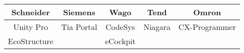 \begin{tabular}{c|c|c|c|c}
 \textbf{Schneider} & \textbf{Siemens} & \textbf{Wago} & \textbf{Tend} & \textbf{Omron}\\\hline
 Unity Pro & Tia Portal & CodeSys & Niagara & CX-Programmer \\
 EcoStructure & & eCockpit & &\\
\end{tabular}
